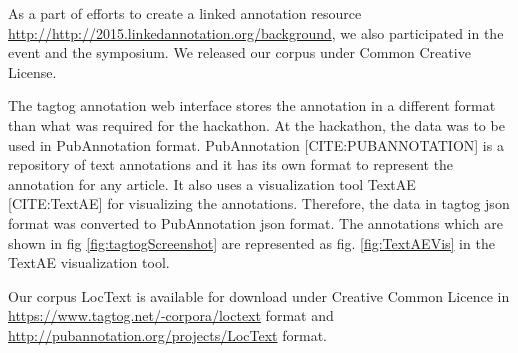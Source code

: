 As a part of efforts to create a linked annotation resource \hyperref[BLAH]{http://http://2015.linkedannotation.org/background}, we also participated in the event and the symposium. We released our corpus under Common Creative License. 

The tagtog annotation web interface stores the annotation in a different format than what was required for the hackathon. At the hackathon, the data was to be used in PubAnnotation format. PubAnnotation [CITE:PUBANNOTATION] is a repository of text annotations and it has its own format to represent the annotation for any article. It also uses a visualization tool TextAE [CITE:TextAE] for visualizing the annotations. Therefore, the data in tagtog json format was converted to PubAnnotation json format. The annotations which are shown in fig \ref{fig:tagtogScreenshot} are represented as fig. \ref{fig:TextAEVis} in the TextAE visualization tool. 

Our corpus LocText is available for download under Creative Common Licence in \hyperref[tagtog]{https://www.tagtog.net/-corpora/loctext} format and \hyperref[PubAnnotation]{http://pubannotation.org/projects/LocText} format.